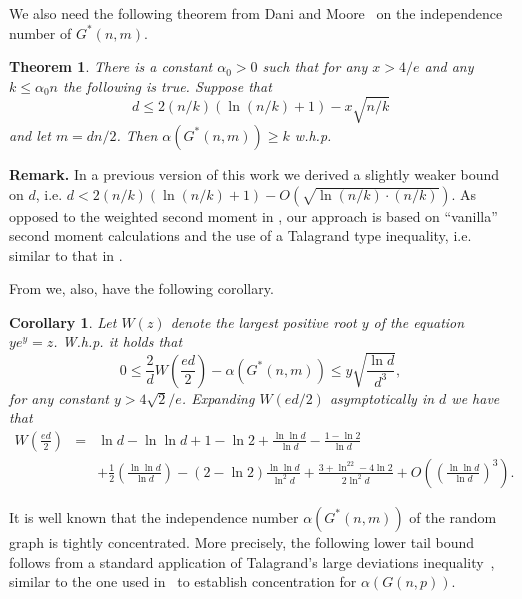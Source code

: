 \documentclass[a4paper,10pt]{article}
\newtheorem{corollary}{Corollary}\renewcommand{\thecorollary}{\arabic{corollary}}
\newtheorem{theorem}{Theorem}\renewcommand{\thetheorem}{\arabic{theorem}}
\newcommand{\whp}{w.h.p.}
\newcommand\Sec{Section}
\begin{document}
\noindent
We also need the following theorem from Dani and Moore~\cite{W2ndM} on
the independence number of $G^*(n,m)$.
\begin{theorem}\label{lemma:SMBound}
There is a constant $\alpha_0>0$ such that
for any $x>4/e$ and any $k\leq \alpha_0n$ the following is true.
Suppose that
\begin{displaymath}
d \leq 2 (n/k)(\ln(n/k)+1)-{x}{\sqrt{n/k}}
\end{displaymath}
and let $m=dn/2$.
Then
$\alpha(G^*(n,m))\geq k$
\whp
\end{theorem}

\noindent
{\bf Remark.}
In a previous version of this work \cite{arxivTR} we derived a slightly 
weaker bound on $d$, i.e. $d<2(n/k)(\ln (n/k)+1)-O(\sqrt{\ln(n/k)\cdot (n/k)})$. 
As opposed to the weighted second moment in \cite{W2ndM}, 
our approach is based on  ``vanilla'' second moment calculations and the
use of a Talagrand type inequality, i.e. similar to that in \cite{frieze-is}.
\\ \vspace{-.3cm}

\noindent
From \cite{W2ndM} we, also, have the following corollary.

\begin{corollary}\label{cor:SMBoundRev}
Let $W(z)$ denote the largest positive root $y$ of the equation
$ye^y=z$. W.h.p. it holds that
\begin{displaymath}
0\leq \frac{2}{d}W\left(\frac{ed}{2}\right)-\alpha(G^*(n,m))  \leq
y\sqrt{\frac{\ln d}{d^3}},
\end{displaymath}
for any constant $y>4\sqrt{2}/e$. Expanding $W(ed/2)$ asymptotically in $d$ 
we have that
\begin{eqnarray}
W\left(\frac{ed}{2}\right) &=& 
\ln d-\ln\ln d+1-\ln 2+\frac{\ln\ln d}{\ln d}-\frac{1-\ln 2}{\ln d}
\nonumber \\
&&+\frac{1}{2}\left(\frac{\ln\ln d}{\ln d}\right)-(2-\ln 2)\frac{\ln\ln d}{\ln^2 d}+
\frac{3+\ln^22-4\ln 2}{2\ln^2d}+O\left(\left(\frac{\ln\ln d}{\ln d}\right)^3\right).
\nonumber
\end{eqnarray}
\end{corollary}

\noindent
It is well known that the independence number $\alpha(G^*(n,m))$ of
the random graph is tightly concentrated. More precisely, the following 
lower tail  bound follows from a standard application of Talagrand's
large deviations inequality~\cite{TalagrandIneq}, similar to the
one used in~\cite[\Sec~7.1]{janson} to establish concentration for
$\alpha(G(n,p))$.
\end{document}

